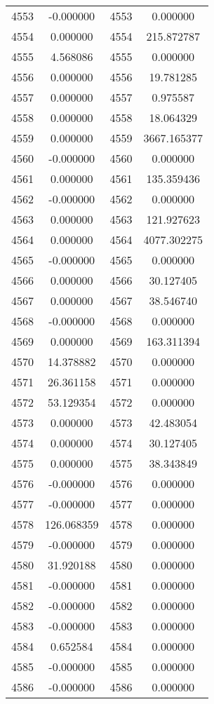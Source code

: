 \documentclass[12pt]{article}
\begin{document}
\begin{longtable}{@{}cccc@{}}
4553 & -0.000000 & 4553 & 0.000000 \\
4554 & 0.000000 & 4554 & 215.872787 \\
4555 & 4.568086 & 4555 & 0.000000 \\
4556 & 0.000000 & 4556 & 19.781285 \\
4557 & 0.000000 & 4557 & 0.975587 \\
4558 & 0.000000 & 4558 & 18.064329 \\
4559 & 0.000000 & 4559 & 3667.165377 \\
4560 & -0.000000 & 4560 & 0.000000 \\
4561 & 0.000000 & 4561 & 135.359436 \\
4562 & -0.000000 & 4562 & 0.000000 \\
4563 & 0.000000 & 4563 & 121.927623 \\
4564 & 0.000000 & 4564 & 4077.302275 \\
4565 & -0.000000 & 4565 & 0.000000 \\
4566 & 0.000000 & 4566 & 30.127405 \\
4567 & 0.000000 & 4567 & 38.546740 \\
4568 & -0.000000 & 4568 & 0.000000 \\
4569 & 0.000000 & 4569 & 163.311394 \\
4570 & 14.378882 & 4570 & 0.000000 \\
4571 & 26.361158 & 4571 & 0.000000 \\
4572 & 53.129354 & 4572 & 0.000000 \\
4573 & 0.000000 & 4573 & 42.483054 \\
4574 & 0.000000 & 4574 & 30.127405 \\
4575 & 0.000000 & 4575 & 38.343849 \\
4576 & -0.000000 & 4576 & 0.000000 \\
4577 & -0.000000 & 4577 & 0.000000 \\
4578 & 126.068359 & 4578 & 0.000000 \\
4579 & -0.000000 & 4579 & 0.000000 \\
4580 & 31.920188 & 4580 & 0.000000 \\
4581 & -0.000000 & 4581 & 0.000000 \\
4582 & -0.000000 & 4582 & 0.000000 \\
4583 & -0.000000 & 4583 & 0.000000 \\
4584 & 0.652584 & 4584 & 0.000000 \\
4585 & -0.000000 & 4585 & 0.000000 \\
4586 & -0.000000 & 4586 & 0.000000 \\

\end{longtable}
\end{document}

